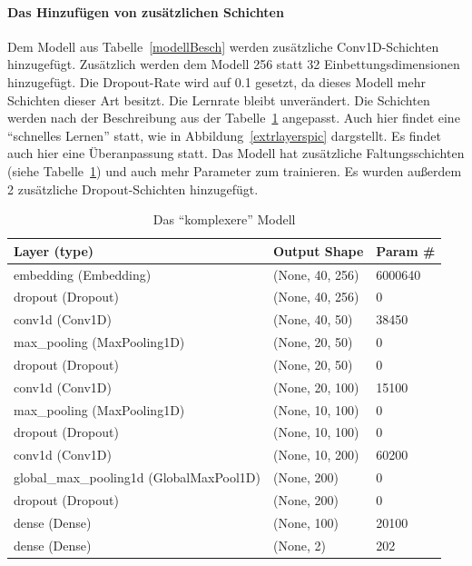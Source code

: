 \paragraph{Das Hinzufügen von zusätzlichen Schichten}
Dem Modell aus Tabelle~\ref{modellBesch} werden zusätzliche Conv1D-Schichten hinzugefügt. Zusätzlich werden dem Modell 256 statt 32 Einbettungsdimensionen hinzugefügt. Die Dropout-Rate wird auf 0.1 gesetzt, da dieses Modell mehr Schichten dieser Art besitzt. Die Lernrate bleibt unverändert. Die Schichten werden nach der Beschreibung aus der Tabelle~\ref{modellBesch2} angepasst. Auch hier findet eine \enquote{schnelles Lernen} statt, wie in Abbildung~\ref{extrlayerspic} dargstellt. Es findet auch hier eine Überanpassung statt. Das Modell hat zusätzliche Faltungsschichten (siehe Tabelle~\ref{modellBesch2}) und auch mehr Parameter zum trainieren. Es wurden außerdem 2 zusätzliche Dropout-Schichten hinzugefügt.

\begin{table}[h]
    \caption{Das \enquote{komplexere} Modell}
    \label{modellBesch2}
    \renewcommand{\arraystretch}{1.2}
    \centering
    \sffamily
    \begin{footnotesize}
        \begin{tabular}{l l l}
            \toprule
            \textbf{Layer (type)}                  & \textbf{Output Shape} & \textbf{Param \#} \\
            \midrule
            embedding (Embedding)  & (None, 40, 256) & 6000640                \\
            dropout (Dropout)  & (None, 40, 256) &     0      \\
            conv1d (Conv1D)                  & (None, 40, 50)     &    38450     \\
            max\_pooling (MaxPooling1D)                  & (None, 20, 50)     &0     \\
            dropout (Dropout)  & (None, 20, 50) &     0      \\
            conv1d (Conv1D)                  & (None, 20, 100)     &    15100     \\
            max\_pooling (MaxPooling1D)                  & (None, 10, 100)     &0     \\
            dropout (Dropout)  & (None, 10, 100) &     0      \\
            conv1d (Conv1D)                  & (None, 10, 200)     &    60200     \\
            global\_max\_pooling1d (GlobalMaxPool1D)   & (None, 200)                    &     0   \\
            dropout (Dropout)  & (None, 200) &     0      \\
            dense (Dense)    & (None, 100)     &  20100      \\
            dense (Dense)   & (None, 2)     & 202                      \\
            \bottomrule
        \end{tabular}
    \end{footnotesize}
    \rmfamily
\end{table}

